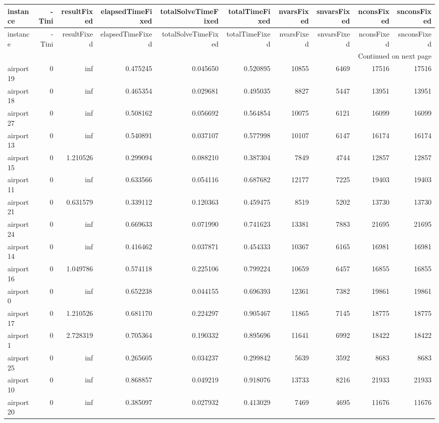 \begin{longtable}{|l|r|r|r|r|r|r|r|r|r|}
\toprule
instance & -Tini & resultFixed & elapsedTimeFixed & totalSolveTimeFixed & totalTimeFixed & nvarsFixed & snvarsFixed & nconsFixed & snconsFixed \\
\midrule
\endfirsthead
\toprule
instance & -Tini & resultFixed & elapsedTimeFixed & totalSolveTimeFixed & totalTimeFixed & nvarsFixed & snvarsFixed & nconsFixed & snconsFixed \\
\midrule
\endhead
\midrule
\multicolumn{10}{r}{Continued on next page} \\
\midrule
\endfoot
\bottomrule
\endlastfoot
airport19 & 0 & inf & 0.475245 & 0.045650 & 0.520895 & 10855 & 6469 & 17516 & 17516 \\
airport18 & 0 & inf & 0.465354 & 0.029681 & 0.495035 & 8827 & 5447 & 13951 & 13951 \\
airport27 & 0 & inf & 0.508162 & 0.056692 & 0.564854 & 10075 & 6121 & 16099 & 16099 \\
airport13 & 0 & inf & 0.540891 & 0.037107 & 0.577998 & 10107 & 6147 & 16174 & 16174 \\
airport15 & 0 & 1.210526 & 0.299094 & 0.088210 & 0.387304 & 7849 & 4744 & 12857 & 12857 \\
airport11 & 0 & inf & 0.633566 & 0.054116 & 0.687682 & 12177 & 7225 & 19403 & 19403 \\
airport21 & 0 & 0.631579 & 0.339112 & 0.120363 & 0.459475 & 8519 & 5202 & 13730 & 13730 \\
airport24 & 0 & inf & 0.669633 & 0.071990 & 0.741623 & 13381 & 7883 & 21695 & 21695 \\
airport14 & 0 & inf & 0.416462 & 0.037871 & 0.454333 & 10367 & 6165 & 16981 & 16981 \\
airport16 & 0 & 1.049786 & 0.574118 & 0.225106 & 0.799224 & 10659 & 6457 & 16855 & 16855 \\
airport0 & 0 & inf & 0.652238 & 0.044155 & 0.696393 & 12361 & 7382 & 19861 & 19861 \\
airport17 & 0 & 1.210526 & 0.681170 & 0.224297 & 0.905467 & 11865 & 7145 & 18775 & 18775 \\
airport1 & 0 & 2.728319 & 0.705364 & 0.190332 & 0.895696 & 11641 & 6992 & 18422 & 18422 \\
airport25 & 0 & inf & 0.265605 & 0.034237 & 0.299842 & 5639 & 3592 & 8683 & 8683 \\
airport10 & 0 & inf & 0.868857 & 0.049219 & 0.918076 & 13733 & 8216 & 21933 & 21933 \\
airport20 & 0 & inf & 0.385097 & 0.027932 & 0.413029 & 7469 & 4695 & 11676 & 11676 \\

\end{longtable}
